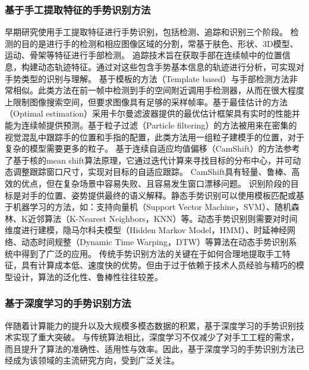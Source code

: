 \subsubsection{基于手工提取特征的手势识别方法}
早期研究使用手工提取特征进行手势识别，包括检测、追踪和识别三个阶段\cite{rautaray2015vision}。
检测的目的是进行手的检测和相应图像区域的分割，常基于肤色\cite{sigal2004skin}、形状\cite{chen2007real}、3D模型\cite{tekin2019h+}、运动\cite{pun2011real}、骨架\cite{jiang2021chal21}等特征进行手部检测。
追踪技术旨在获取手部在连续帧中的位置信息，构建动态轨迹特征。通过对这些包含手势基本信息的轨迹进行分析，可实现对手势类型的识别与理解。
基于模板的方法（Template based）\cite{crowley1995finger}与手部检测方法非常相似。此类方法在前一帧中检测到手的空间附近调用手检测器，从而在很大程度上限制图像搜索空间，但要求图像具有足够的采样帧率。基于最佳估计的方法（Optimal estimation）\cite{argyros2004real}采用卡尔曼滤波器\cite{kalman1960new}提供的最优估计框架具有实时的性能并能为连续帧提供预测。基于粒子过滤（Particle filtering）的方法\cite{perez2002color}被用来在密集的视觉混乱中跟踪手的位置和手指的配置，此类方法用一组粒子建模手的位置，对于复杂的模型需要更多的粒子。
基于连续自适应均值偏移（CamShift）的方法\cite{wang2010study}参考了基于核的mean shift算法原理，它通过迭代计算来寻找目标的分布中心，并可动态调整跟踪窗口尺寸，实现对目标的自适应跟踪。
CamShift具有轻量、鲁棒、高效的优点，但在复杂场景中容易失败、且容易发生窗口漂移问题。
识别阶段的目标是对手的位置、姿势提供最终的语义解释。静态手势识别可以使用模板匹配或基于机器学习的方法\cite{基于视觉的动态手势识别研究综述}，如：支持向量机（Support Vector Machine，SVM）\cite{burges1998tutorial}、随机森林\cite{基于视觉的动态手势识别研究综述}、K近邻算法（K-Nearest Neighbors，KNN）\cite{thirumuruganathan2010knn}等。动态手势识别则需要对时间维度进行建模，隐马尔科夫模型（Hidden Markov Model，HMM）\cite{liang1996sign}、时延神经网络\cite{sigal2004skin}、动态时间规整（Dynamic Time Warping，DTW）\cite{corradini2001dynamic}等算法在动态手势识别系统中得到了广泛的应用。
传统手势识别方法的关键在于如何合理地提取手工特征，具有计算成本低、速度快的优势。但由于过于依赖于技术人员经验与精巧的模型设计，算法的泛化性、鲁棒性往往较差。

\subsubsection{基于深度学习的手势识别方法} %
伴随着计算能力的提升以及大规模多模态数据的积累，基于深度学习的手势识别技术实现了重大突破。
与传统算法相比，深度学习不仅减少了对手工工程的需求，而且提升了算法的准确性、适用性与效率。因此，基于深度学习的手势识别方法已经成为该领域的主流研究方向，受到广泛关注。

